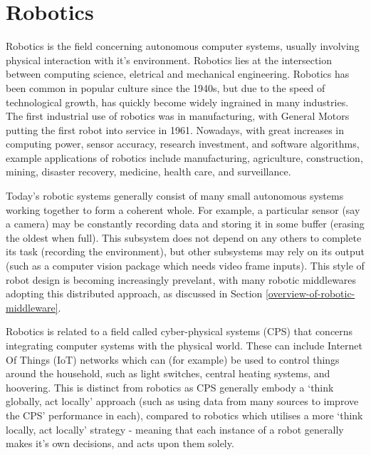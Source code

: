 \documentclass[../dissertation.tex]{subfiles}
\begin{document}
\section{Robotics}

Robotics is the field concerning autonomous computer systems, usually involving physical interaction with it's environment. Robotics lies at the intersection between computing science, eletrical and mechanical engineering. Robotics has been common in popular culture since the 1940s\cite{hockstein2007history}, but due to the speed of technological growth, has quickly become widely ingrained in many industries. The first industrial use of robotics was in manufacturing, with General Motors putting the first robot into service in 1961\cite{hagele2016ashorthistory}. Nowadays, with great increases in computing power, sensor accuracy, research investment, and software algorithms, example applications of robotics include manufacturing, agriculture, construction, mining, disaster recovery, medicine, health care, and surveillance\cite{hagele2016robotsatwork}.

Today's robotic systems generally consist of many small autonomous systems working together to form a coherent whole\cite{4058987}. For example, a particular sensor (say a camera) may be constantly recording data and storing it in some buffer (erasing the oldest when full). This subsystem does not depend on any others to complete its task (recording the environment), but other subsystems may rely on its output (such as a computer vision package which needs video frame inputs). This style of robot design is becoming increasingly prevelant, with many robotic middlewares adopting this distributed approach, as discussed in Section \ref{overview-of-robotic-middleware}.

Robotics is related to a field called cyber-physical systems (CPS) that concerns integrating computer systems with the physical world\cite{Lee:EECS-2008-8}. These can include Internet Of Things (IoT) networks\cite{atzori2010internet} which can (for example) be used to control things around the household, such as light switches, central heating systems, and hoovering. This is distinct from robotics as CPS generally embody a `think globally, act locally' approach (such as using data from many sources to improve the CPS' performance in each), compared to robotics which utilises a more `think locally, act locally' strategy - meaning that each instance of a robot generally makes it's own decisions, and acts upon them solely.
\end{document}
